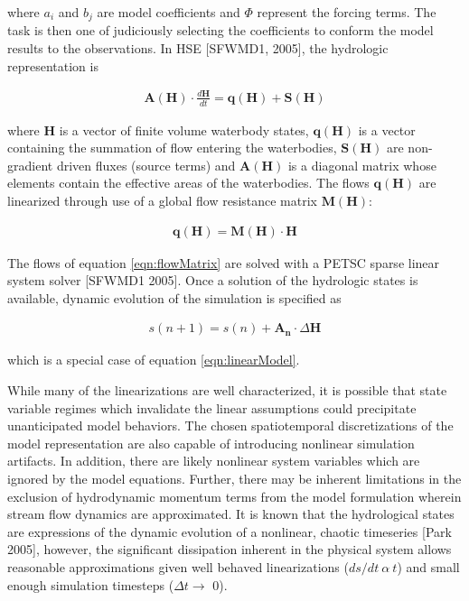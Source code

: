 where $a_i$ and $b_j$ are model coefficients and $\Phi$ represent the
forcing terms. The task is then one of judiciously selecting the
coefficients to conform the model results to the observations. In HSE
[SFWMD1, 2005], the hydrologic representation is

\begin{align}\label{eqn:hseHydroRep}
 \mathbf{A}(\mathbf{H}) \cdot \frac{d\mathbf{H}}{dt} = \mathbf{q}(\mathbf{H}) + \mathbf{S}(\mathbf{H})
\end{align}

where $\mathbf{H}$ is a vector of finite volume waterbody states,
$\mathbf{q(H)}$ is a vector containing the summation of flow entering
the waterbodies, $\mathbf{S(H)}$ are non-gradient driven fluxes (source
terms) and $\mathbf{A(H)}$ is a diagonal matrix whose elements contain
the effective areas of the waterbodies. The flows $\mathbf{q(H)}$ are
linearized through use of a global flow resistance matrix
$\mathbf{M(H)}$:

\begin{align}\label{eqn:flowMatrix}
 \mathbf{q}(\mathbf{H}) = \mathbf{M}(\mathbf{H}) \cdot \mathbf{H}
\end{align}

The flows of equation \ref{eqn:flowMatrix} are solved with a PETSC
sparse linear system solver [SFWMD1 2005]. Once a solution of the
hydrologic states is available, dynamic evolution of the simulation is
specified as

\begin{align}
  s(n+1) = s(n) + \mathbf{A_n} \cdot \Delta \mathbf{H}
\end{align}

which is a special case of equation \ref{eqn:linearModel}. 

While many of the linearizations are well characterized, it is
possible that state variable regimes which invalidate the linear
assumptions could precipitate unanticipated model behaviors. The
chosen spatiotemporal discretizations of the model representation are
also capable of introducing nonlinear simulation artifacts. In
addition, there are likely nonlinear system variables which are
ignored by the model equations. Further, there may be inherent
limitations in the exclusion of hydrodynamic momentum terms from the
model formulation wherein stream flow dynamics are approximated. It is
known that the hydrological states are expressions of the dynamic
evolution of a nonlinear, chaotic timeseries [Park 2005], however, the
significant dissipation inherent in the physical system allows
reasonable approximations given well behaved linearizations ($ds/dt\ 
\alpha\ t$) and small enough simulation timesteps ($\Delta t \to$ 0).

